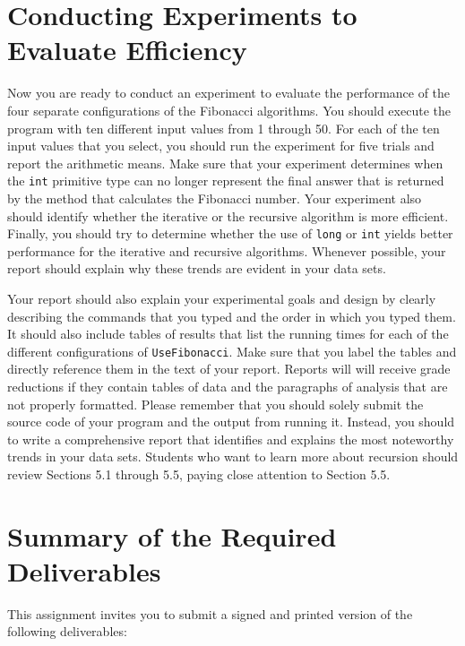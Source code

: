 \vspace*{-.05in}
\section*{Conducting Experiments to Evaluate Efficiency}
\vspace*{-.05in}

Now you are ready to conduct an experiment to evaluate the performance of the four separate configurations of the
Fibonacci algorithms. You should execute the program with ten different input values from 1 through 50. For each of the
ten input values that you select, you should run the experiment for five trials and report the arithmetic means. Make
sure that your experiment determines when the {\tt int} primitive type can no longer represent the final answer that is
returned by the method that calculates the Fibonacci number. Your experiment also should identify whether the iterative
or the recursive algorithm is more efficient.  Finally, you should try to determine whether the use of {\tt long} or
{\tt int} yields better performance for the iterative and recursive algorithms. Whenever possible, your report should
explain why these trends are evident in your data sets.

Your report should also explain your experimental goals and design by clearly describing the commands that you typed and
the order in which you typed them. It should also include tables of results that list the running times for each of the
different configurations of {\tt UseFibonacci}.  Make sure that you label the tables and directly reference them in the
text of your report. Reports will will receive grade reductions if they contain tables of data and the paragraphs of
analysis that are not properly formatted. Please remember that you should solely submit the source code of your program
and the output from running it. Instead, you should to write a comprehensive report that identifies and explains the
most noteworthy trends in your data sets. Students who want to learn more about recursion should review Sections 5.1
through 5.5, paying close attention to Section 5.5.

\section*{Summary of the Required Deliverables}

This assignment invites you to submit a signed and printed version of the following deliverables:

